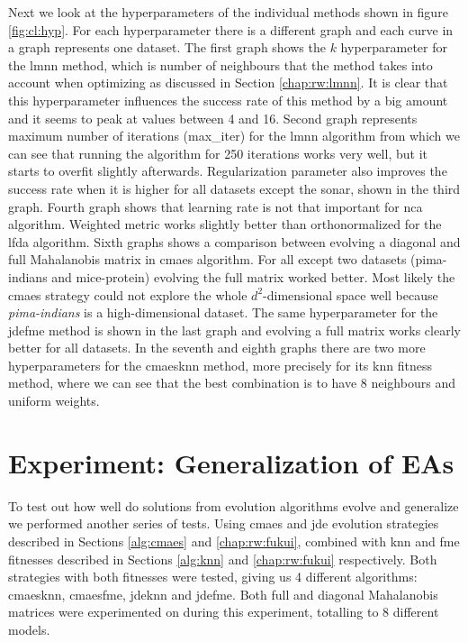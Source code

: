 \documentclass[12pt,a4paper]{report}
\begin{document}
Next we look at the hyperparameters of the individual methods shown in figure \ref{fig:cl:hyp}. For each hyperparameter there is a different graph and each curve in a graph represents one dataset. The first graph shows the $k$ hyperparameter for the \ac{lmnn} method, which is number of neighbours that the method takes into account when optimizing as discussed in Section \ref{chap:rw:lmnn}. It is clear that this hyperparameter influences the success rate of this method by a big amount and it seems to peak at values between 4 and 16. Second graph represents maximum number of iterations (max\_iter) for the \ac{lmnn} algorithm from which we can see that running the algorithm for 250 iterations works very well, but it starts to overfit slightly afterwards. Regularization parameter also improves the success rate when it is higher for all datasets except the sonar, shown in the third graph. Fourth graph shows that learning rate is not that important for \ac{nca} algorithm. Weighted metric works slightly better than orthonormalized for the \ac{lfda} algorithm. Sixth graphs shows a comparison between evolving a diagonal and full Mahalanobis matrix in \ac{cmaes} algorithm. For all except two datasets (pima-indians and mice-protein) evolving the full matrix worked better. Most likely the \ac{cmaes} strategy could not explore the whole $d^2$-dimensional space well because \textit{pima-indians} is a high-dimensional dataset. The same hyperparameter for the \ac{jdefme} method is shown in the last graph and evolving a full matrix works clearly better for all datasets. In the seventh and eighth graphs there are two more hyperparameters for the \ac{cmaesknn} method, more precisely for its \ac{knn} fitness method, where we can see that the best combination is to have 8 neighbours and uniform weights.


\section{Experiment: Generalization of EAs} \label{chap:exp:fitness}

To test out how well do solutions from evolution algorithms evolve and generalize we performed another series of tests. Using \ac{cmaes} and \ac{jde} evolution strategies described in Sections \ref{alg:cmaes} and \ref{chap:rw:fukui}, combined with \ac{knn} and \ac{fme} fitnesses described in Sections \ref{alg:knn} and \ref{chap:rw:fukui} respectively. Both strategies with both fitnesses were tested, giving us 4 different algorithms: \ac{cmaesknn}, \ac{cmaesfme}, \ac{jdeknn} and \ac{jdefme}. Both full and diagonal Mahalanobis matrices were experimented on during this experiment, totalling to 8 different models.
\end{document}
